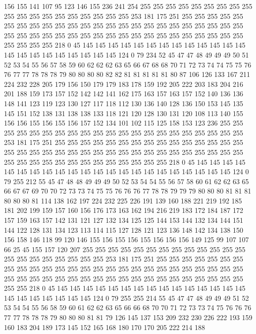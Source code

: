 156 155 141 107 95 123 146 155 236 241 254 255 255 255 255 255 255 255 255 255
255 255 255 255 255 255 255 255 255 255 253 181 175 251 255 255 255 255 255 255
255 255 255 255 255 255 255 255 255 255 255 255 255 255 255 255 255 255 255 255
255 255 255 255 255 255 255 255 255 255 255 255 255 255 255 255 255 255 255 255
255 218 0 45 145 145 145 145 145 145 145 145 145 145 145 145 145 145 145 145
145 145 145 145 145 145 124 0 79 234 52 45 47 47 48 49 49 49 50 51
52 53 54 55 56 57 58 59 60 62 62 62 63 65 66 67 68 68 70 71
72 73 74 74 75 75 76 76 77 77 78 78 78 79 80 80 80 80 82 82
81 81 81 81 81 80 87 106 126 133 167 211 224 232 228 205 179 156 150 179
179 183 178 159 192 205 222 203 183 204 216 201 188 159 173 157 152 142 142 141
162 175 163 157 163 157 152 140 136 136 148 141 123 119 123 130 127 117 118 112
130 136 140 128 136 150 153 145 135 145 151 152 138 131 138 138 133 118 121 120
128 130 131 120 108 113 140 155 156 156 155 156 155 156 157 152 134 101 102 115
125 158 153 123 236 255 255 255 255 255 255 255 255 255 255 255 255 255 255 255
255 255 255 255 255 255 253 181 175 251 255 255 255 255 255 255 255 255 255 255
255 255 255 255 255 255 255 255 255 255 255 255 255 255 255 255 255 255 255 255
255 255 255 255 255 255 255 255 255 255 255 255 255 255 255 255 255 218 0 45
145 145 145 145 145 145 145 145 145 145 145 145 145 145 145 145 145 145 145 145
145 145 124 0 79 255 212 55 45 47 48 48 49 49 49 50 52 53 54 54
55 56 57 58 60 61 62 62 63 65 66 67 67 69 70 70 72 73 73 74
75 75 76 76 76 77 78 78 79 79 79 80 80 80 81 81 81 80 80 80
81 114 138 162 197 224 232 225 226 191 139 160 188 221 219 192 185 181 202 199
159 157 160 156 176 173 163 162 194 216 219 183 172 184 187 172 157 159 163 157
142 131 121 127 132 134 125 125 144 153 144 132 134 144 151 144 122 128 131 134
123 113 114 115 127 128 121 123 136 148 142 134 138 150 156 158 146 118 99 120
146 155 156 155 156 155 156 156 156 149 125 99 107 107 66 25 45 155 157 120
207 255 255 255 255 255 255 255 255 255 255 255 255 255 255 255 255 255 255 255
255 255 253 181 175 251 255 255 255 255 255 255 255 255 255 255 255 255 255 255
255 255 255 255 255 255 255 255 255 255 255 255 255 255 255 255 255 255 255 255
255 255 255 255 255 255 255 255 255 255 255 255 255 218 0 45 145 145 145 145
145 145 145 145 145 145 145 145 145 145 145 145 145 145 145 145 145 145 124 0
79 255 255 214 55 45 47 47 48 49 49 49 51 52 53 54 54 55 56 58
59 60 61 62 62 63 65 66 66 68 70 70 71 72 73 73 74 75 76 76
76 77 77 78 78 78 79 80 80 80 81 81 79 126 145 137 153 209 232 230
226 222 193 159 160 183 204 189 173 145 152 165 168 180 170 170 205 222 214 188
